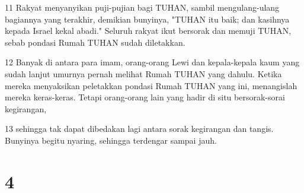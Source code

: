\par 11 Rakyat menyanyikan puji-pujian bagi TUHAN, sambil mengulang-ulang bagiannya yang terakhir, demikian bunyinya, "TUHAN itu baik; dan kasihnya kepada Israel kekal abadi." Seluruh rakyat ikut bersorak dan memuji TUHAN, sebab pondasi Rumah TUHAN sudah diletakkan.
\par 12 Banyak di antara para imam, orang-orang Lewi dan kepala-kepala kaum yang sudah lanjut umurnya pernah melihat Rumah TUHAN yang dahulu. Ketika mereka menyaksikan peletakkan pondasi Rumah TUHAN yang ini, menangislah mereka keras-keras. Tetapi orang-orang lain yang hadir di situ bersorak-sorai kegirangan,
\par 13 sehingga tak dapat dibedakan lagi antara sorak kegirangan dan tangis. Bunyinya begitu nyaring, sehingga terdengar sampai jauh.

\chapter{4}

